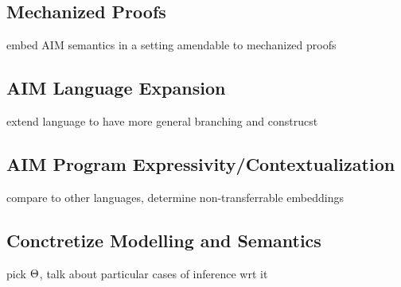 \documentclass{article}
\begin{document}
\subsection{Mechanized Proofs}
\label{mp}

embed AIM semantics in a setting amendable to mechanized proofs

\subsection{AIM Language Expansion}
\label{ale}

extend language to have more general branching and construcst


\subsection{AIM Program Expressivity/Contextualization}

compare to other languages, determine non-transferrable embeddings

\subsection{Conctretize Modelling and Semantics}

pick $\Theta$, talk about particular cases of inference wrt it
\end{document}

